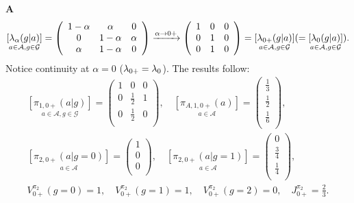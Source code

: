 \begin{example}
\vspace{1em}
\noindent{}\textbf{A}
$$
\underset{a\in \mathcal{A}, g \in \mathcal{G}}{[\mathit{\lambda}_{\alpha}(g|a)]} =
\left(
\begin{array}{ccc}
1-\alpha  & \alpha   & 0 \\
0         & 1-\alpha & \alpha  \\
\alpha    & 1-\alpha & 0 \\
\end{array}
\right)
\xrightarrow{\alpha\rightarrow 0+}
\left(
\begin{array}{ccc}
1  & 0  & 0 \\
0  & 1  & 0 \\
0  & 1  & 0 \\
\end{array}
\right)
=
\underset{a\in \mathcal{A}, g \in \mathcal{G}}{[\mathit{\lambda}_{0+}(g|a)]}
(=
\underset{a\in \mathcal{A}, g \in \mathcal{G}}{[\mathit{\lambda}_{0}(g|a)]}
)
.
$$
Notice continuity at $\alpha = 0$ ($\mathit{\lambda}_{0+} = \mathit{\lambda}_{0}$).
The results follow:
$$
\begin{gathered}
\underset{a\in \mathcal{A}, g \in \mathcal{G}}{[\pi_{1,0+}(a|g)]} =
\left(
\begin{array}{ccc}
1 & 0            & 0 \\
0           & \frac{1}{2}  & 1  \\
0 & \frac{1}{2}  & 0 \\
\end{array}
\right)
,\quad
\underset{a\in \mathcal{A}}{[\pi_{A,1,0+}(a)]} =
\left(
\begin{array}{c}
\frac{1}{3} \\
\frac{1}{2} \\
\frac{1}{6}  \\
\end{array}
\right)
,
\\
\underset{a\in \mathcal{A}}{[\pi_{2,0+}(a|g=0)]} =
\left(
\begin{array}{c}
1 \\
0 \\
0  \\
\end{array}
\right)
,\quad
\underset{a\in \mathcal{A}}{[\pi_{2,0+}(a|g=1)]} =
\left(
\begin{array}{c}
0 \\
\frac{3}{4} \\
\frac{1}{4}  \\
\end{array}
\right)
,\\
V_{0+}^{\pi_2}(g=0) = 1,\quad
V_{0+}^{\pi_2}(g=1) = 1,\quad
V_{0+}^{\pi_2}(g=2) = 0,\quad
J_{0+}^{\pi_2} = \frac{2}{3}.
\end{gathered}
$$


\end{example}
